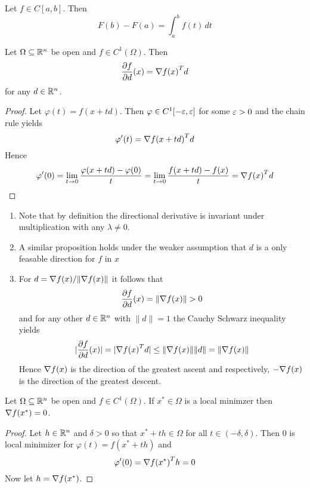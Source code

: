 \begin{theorem}\label{thm:fund_calculus}
Let \( f \in C[a,b] \). Then
\[
    F(b) -F(a) = \int_a^b f(t)\,dt
\]
\end{theorem}

\begin{lemma}\label{lemma:directional_derivative}
Let \( \Omega \subseteq \mathbb{R}^n \) be open and \( f \in C^1(\Omega) \). Then
\[
    \frac{\partial f}{\partial d}(x) = \nabla{f(x)}^T d
\]
for any \( d \in \mathbb{R}^n \).
\end{lemma}

\begin{proof}
Let \( \varphi(t) = f(x + td) \). Then \( \varphi \in C^1[-\varepsilon, \varepsilon ] \) for some \( \varepsilon > 0 \) 
and the chain rule yields 
\[ 
    \varphi^\prime(t) = {\nabla f(x + td)}^T d 
\]
Hence
\[
    \varphi^\prime(0) = \lim_{t \to 0} \frac{\varphi(x + td) - \varphi(0)}{t} = 
        \lim_{t \to 0} \frac{f(x + td) - f(x)}{t} = {\nabla f(x)}^T d
\]
\end{proof}
\bigskip

\begin{remark}\hfill
    \begin{enumerate}
        \item Note that by definition the directional derivative is invariant under multiplication 
            with any \( \lambda \ne 0 \).

        \item A similar proposition holds under the weaker assumption that \( d \) is a only feasable direction 
            for \( f \) in \( x \)

        \item For \( d = \nabla{f(x)}/\| \nabla{f(x)}\| \) it follows that
            \[
                \frac{\partial f}{\partial d}(x) = \|\nabla{f(x)}\| > 0
            \]
            and for any other \( d \in \mathbb{R}^n \) with \( \|d\| = 1 \) the Cauchy Schwarz inequality yields
            \[
                |\frac{\partial f}{\partial d}(x)| = |\nabla{f(x)}^T d| \le \|\nabla{f(x)}\| \|d\| = 
                    \|\nabla{f(x)}\|
            \]
            Hence \( \nabla{f(x)} \) is the direction of the greatest ascent and respectively, 
            \( -\nabla{f(x)} \) is the direction of the greatest descent.
    \end{enumerate}
\end{remark}
\bigskip

\begin{theorem}\label{thm:fonc}
Let \( \Omega \subseteq \mathbb{R}^n \) be open and \( f \in C^1(\Omega) \). If \( x^* \in \Omega \) is a local minimzer then
\( \nabla f(x^*) = 0 \).
\end{theorem}

\begin{proof}
Let \( h \in \mathbb{R}^n \) and \( \delta > 0 \) so that \( x^* + th \in \Omega \) for all \( t \in (-\delta, \delta) \). 
Then \( 0 \) is local minimizer for \( \varphi(t) = f(x^* + th) \) and
\[
    \varphi^\prime(0) = {\nabla f(x^*)}^T h = 0
\]
Now let \( h = \nabla f(x^*) \). 
\end{proof}
\bigskip
